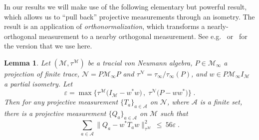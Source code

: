 \documentclass[11pt]{article}
\newtheorem{lemma}[theorem]{Lemma}
\theoremstyle{definition}
\newcommand{\Id}{\ensuremath{I}}
\newcommand{\mA}{\ensuremath{\mathcal{A}}}
\newcommand{\mM}{\ensuremath{\mathcal{M}}}
\newcommand{\eps}{\varepsilon}
\newcommand{\mN}{\mathcal{N}}
\begin{document}
	In our results we will make use of the following elementary but powerful result, which allows us to ``pull back'' projective measurements through an isometry. The result is an application of \emph{orthonormalization}, which transforms a nearly-orthogonal measurement to a nearby orthogonal measurement. See e.g.~\cite{kempe2011parallel,ji2020quantum} or~\cite[Theorem 1.2]{de2021orthogonalization} for the version that we use here. 
	
\begin{lemma}\label{lem:pull-back}
Let  $(\mM,\tau^\mM)$ be a tracial von Neumann algebra, $P\in\mM_\infty$ a projection of finite trace, $\mN=P\mM_\infty P$ and $\tau^\mN=\tau_\infty/\tau_\infty(P)$, and $w\in P \mM_\infty \Id_\mM$ a partial isometry. Let 
\[ \eps = \max\big\{ \tau^\mM\big(\Id_\mM - w^* w\big)\,,\;\tau^\mN\big( P- w w^*\big)\big\}\;.\] 
 Then for any projective measurement $\{T_a\}_{a \in \mA}$ on $\mN$, where $\mA$ is a finite set, there is a projective measurement $\{Q_a\}_{a \in \mA}$ on $\mM$ such that 
\begin{equation}
\label{eq:pull-back} \sum_{a \in \mA} \big\| Q_a - w^* T_a w\big\|_{\tau^\mM}^2 \,\leq \ 56\eps\;.
\end{equation}
\end{lemma}	
\end{document}
